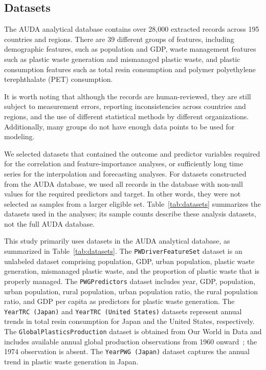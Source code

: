 \subsection{Datasets}

The AUDA analytical database contains over 28{,}000 extracted records across 195 countries and regions.
There are 39 different groups of features, including demographic features, such as population and GDP, waste management features such as plastic waste generation and mismanaged plastic waste, and plastic consumption features such as total resin consumption and polymer polyethylene terephthalate (PET) consumption.

It is worth noting that although the records are human-reviewed, they are still subject to measurement errors, reporting inconsistencies across countries and regions, and the use of different statistical methods by different organizations.
Additionally, many groups do not have enough data points to be used for modeling.

We selected datasets that contained the outcome and predictor variables required for the correlation and feature-importance analyses, or sufficiently long time series for the interpolation and forecasting analyses.
For datasets constructed from the AUDA database, we used all records in the database with non-null values for the required predictors and target. In other words, they were not selected as samples from a larger eligible set.
Table~\ref{tab:datasets} summarizes the datasets used in the analyses; its sample counts describe these analysis datasets, not the full AUDA database.



This study primarily uses datasets in the AUDA analytical database, as summarized in Table~\ref{tab:datasets}.
The \texttt{PWDriverFeatureSet} dataset is an unlabeled dataset comprising population, GDP, urban population, plastic waste generation, mismanaged plastic waste, and the proportion of plastic waste that is properly managed.
The \texttt{PWGPredictors} dataset includes year, GDP, population, urban population, rural population, urban population ratio, the rural population ratio, and GDP per capita as predictors for plastic waste generation.
The \texttt{YearTRC (Japan)} and \texttt{YearTRC (United States)} datasets represent annual trends in total resin consumption for Japan and the United States, respectively.
The \texttt{GlobalPlasticsProduction} dataset is obtained from Our World in Data and includes available annual global production observations from 1960 onward~\cite{owid_global_plastics_production}; the 1974 observation is absent.
The \texttt{YearPWG (Japan)} dataset captures the annual trend in plastic waste generation in Japan.

